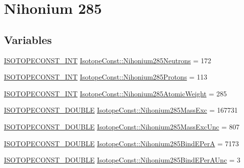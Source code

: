 \hypertarget{group___isotope_const-_nihonium-_nh285}{}\section{Nihonium 285}
\label{group___isotope_const-_nihonium-_nh285}
\subsection*{Variables}
\begin{DoxyCompactItemize}
\item 
\mbox{\hyperlink{group___isotope_const-_macros_ga5f18360b3e99483a35c32d789e62621c}{I\+S\+O\+T\+O\+P\+E\+C\+O\+N\+S\+T\+\_\+\+I\+NT}} \mbox{\hyperlink{group___isotope_const-_nihonium-_nh285_ga13e3d83e2a730c266ce2939226d52207}{Isotope\+Const\+::\+Nihonium285\+Neutrons}} = 172
\item 
\mbox{\hyperlink{group___isotope_const-_macros_ga5f18360b3e99483a35c32d789e62621c}{I\+S\+O\+T\+O\+P\+E\+C\+O\+N\+S\+T\+\_\+\+I\+NT}} \mbox{\hyperlink{group___isotope_const-_nihonium-_nh285_gad192e100896ea5188c857c8dd8294a0f}{Isotope\+Const\+::\+Nihonium285\+Protons}} = 113
\item 
\mbox{\hyperlink{group___isotope_const-_macros_ga5f18360b3e99483a35c32d789e62621c}{I\+S\+O\+T\+O\+P\+E\+C\+O\+N\+S\+T\+\_\+\+I\+NT}} \mbox{\hyperlink{group___isotope_const-_nihonium-_nh285_gafb68ab9608b088de75a8223752bd5c70}{Isotope\+Const\+::\+Nihonium285\+Atomic\+Weight}} = 285
\item 
\mbox{\hyperlink{group___isotope_const-_macros_ga8f45a7272ce02c0b4c65c44636ed719a}{I\+S\+O\+T\+O\+P\+E\+C\+O\+N\+S\+T\+\_\+\+D\+O\+U\+B\+LE}} \mbox{\hyperlink{group___isotope_const-_nihonium-_nh285_ga076b1af3f1eb2cfd13af257827e89132}{Isotope\+Const\+::\+Nihonium285\+Mass\+Exc}} = 167731
\item 
\mbox{\hyperlink{group___isotope_const-_macros_ga8f45a7272ce02c0b4c65c44636ed719a}{I\+S\+O\+T\+O\+P\+E\+C\+O\+N\+S\+T\+\_\+\+D\+O\+U\+B\+LE}} \mbox{\hyperlink{group___isotope_const-_nihonium-_nh285_ga47bc4d1ec2e946d4d7db998803c7ac9f}{Isotope\+Const\+::\+Nihonium285\+Mass\+Exc\+Unc}} = 807
\item 
\mbox{\hyperlink{group___isotope_const-_macros_ga8f45a7272ce02c0b4c65c44636ed719a}{I\+S\+O\+T\+O\+P\+E\+C\+O\+N\+S\+T\+\_\+\+D\+O\+U\+B\+LE}} \mbox{\hyperlink{group___isotope_const-_nihonium-_nh285_gabf64ccfe09c4ca9208e1c5470e023f29}{Isotope\+Const\+::\+Nihonium285\+Bind\+E\+PerA}} = 7173
\item 
\mbox{\hyperlink{group___isotope_const-_macros_ga8f45a7272ce02c0b4c65c44636ed719a}{I\+S\+O\+T\+O\+P\+E\+C\+O\+N\+S\+T\+\_\+\+D\+O\+U\+B\+LE}} \mbox{\hyperlink{group___isotope_const-_nihonium-_nh285_ga2fb051212cf66d0bc88f4a43623c6bbd}{Isotope\+Const\+::\+Nihonium285\+Bind\+E\+Per\+A\+Unc}} = 3

\end{DoxyCompactItemize}
